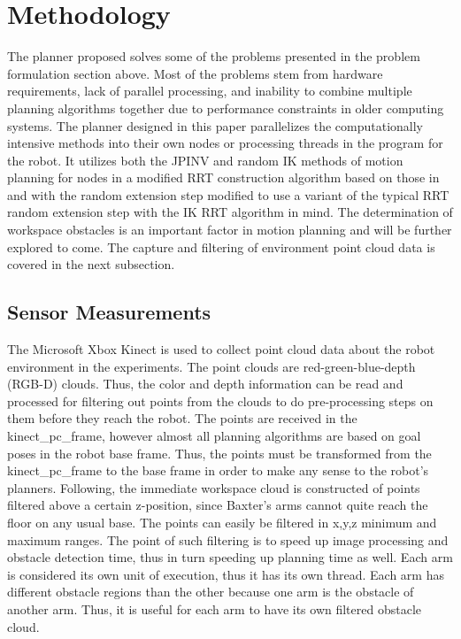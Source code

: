 \documentclass[conference]{IEEEtran} \usepackage[T1]{fontenc} \usepackage[backend=biber, style=ieee]{biblatex}
\begin{document}
\section{Methodology} \label{Methodology}

The planner proposed solves some of the problems presented in the problem formulation section above. Most of the problems stem from hardware requirements, lack of parallel 
processing, and inability to combine multiple planning algorithms together due to performance constraints in older computing systems. The planner designed in this paper 
parallelizes the computationally intensive methods into their own nodes or processing threads in the program for the robot. It utilizes both the JPINV and random IK methods
of motion planning for nodes in a modified RRT construction algorithm based on those in \cite{random_planner_wo_ik} and \cite{humanoid_motion_planning} with the random extension
step modified to use a variant of the typical RRT random extension step with the IK RRT algorithm in mind. The determination of workspace obstacles is an important factor
in motion planning and will be further explored to come. The capture and filtering of environment point cloud data is covered in the next subsection.

\subsection{Sensor Measurements} \label{Sensor Measurements}

The Microsoft Xbox Kinect is used to collect point cloud data about the robot environment in the experiments. The point clouds are red-green-blue-depth (RGB-D) clouds. 
Thus, the color and depth information can be read and processed for filtering out points from the clouds to do pre-processing steps on them before they reach the robot. 
The points are received in the kinect\_pc\_frame, however almost all planning algorithms are based on goal poses in the robot base frame. Thus, the points must be 
transformed from the kinect\_pc\_frame to the base frame in order to make any sense to the robot's planners. Following, the immediate workspace cloud is constructed of 
points filtered above a certain z-position, since Baxter's arms cannot quite reach the floor on any usual base. The points can easily be filtered in x,y,z minimum and 
maximum ranges. The point of such filtering is to speed up image processing and obstacle detection time, thus in turn speeding up planning time as well. Each arm is 
considered its own unit of execution, thus it has its own thread. Each arm has different obstacle regions than the other because one arm is the obstacle
of another arm. Thus, it is useful for each arm to have its own filtered obstacle cloud. 
\end{document}
